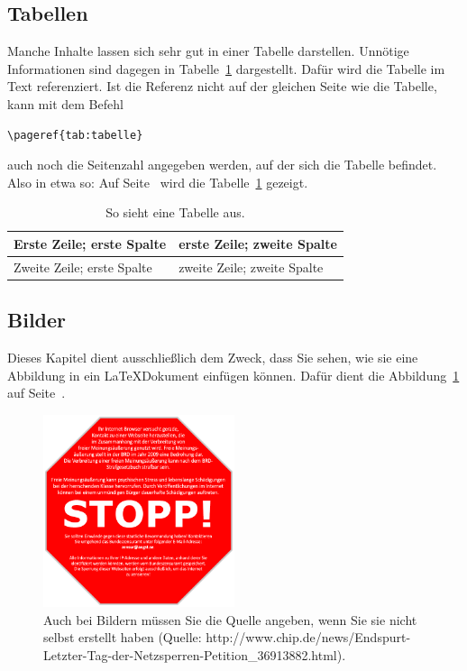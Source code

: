 \documentclass[
     11pt,         %
     a4paper,      %
     oneside,
     ]{article}
\begin{document}
\subsection{Tabellen}\label{subsec:tabelle}
Manche Inhalte lassen sich sehr gut in einer Tabelle darstellen. Unnötige Informationen sind dagegen in Tabelle~\ref{tab:tabelle} dargestellt. Dafür wird die Tabelle im Text referenziert. Ist die Referenz nicht auf der gleichen Seite wie die Tabelle, kann mit dem Befehl \begin{verbatim}\pageref{tab:tabelle}\end{verbatim} auch noch die Seitenzahl angegeben werden, auf der sich die Tabelle befindet. Also in etwa so:
Auf Seite~\pageref{tab:tabelle} wird die Tabelle~\ref{tab:tabelle} gezeigt.

\begin{table}
\centering
\begin{tabular}{ll}
\hline
Erste Zeile; erste Spalte  & erste Zeile; zweite Spalte  \\
\hline
Zweite Zeile; erste Spalte & zweite Zeile; zweite Spalte \\
\hline
\end{tabular}
\caption{So sieht eine Tabelle aus.}
\label{tab:tabelle}
\end{table}


\subsection{Bilder}\label{subsec:bilder}
Dieses Kapitel dient ausschließlich dem Zweck, dass Sie sehen, wie sie eine Abbildung in ein \LaTeX Dokument einfügen können. Dafür dient die Abbildung~\ref{fig:figure} auf Seite~\pageref{fig:figure}.

\begin{figure}
\centering
\includegraphics[width=0.5\textwidth]{pics/stopp_bild}
\caption{Auch bei Bildern müssen Sie die Quelle angeben, wenn Sie sie nicht selbst erstellt haben (Quelle: http://www.chip.de/news/Endspurt-Letzter-Tag-der-Netzsperren-Petition\_36913882.html). }
\label{fig:figure}
\end{figure}
\end{document}
